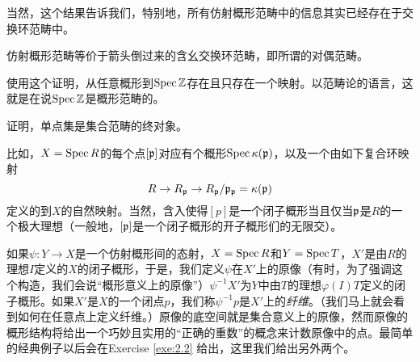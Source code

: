 当然，这个结果告诉我们，特别地，所有仿射概形范畴中的信息其实已经存在于交换环范畴中。

\begin{coro}\label{coro:1.41}
	仿射概形范畴等价于箭头倒过来的含幺交换环范畴，即所谓的对偶范畴。
\end{coro}

\begin{exe}\label{exe:1.42}
	\begin{compactenum}[(a)]
	\item 使用这个证明，从任意概形到$\operatorname{Spec} \mathbb{Z}$存在且只存在一个映射。以范畴论的语言，这就是在说$\operatorname{Spec} \mathbb{Z}$是概形范畴的。
	\item 证明，单点集是集合范畴的终对象。
	\end{compactenum}
\end{exe}

比如，$X=\operatorname{Spec} R$的每个点$[\mathfrak{p}]$对应有个概形$\operatorname{Spec} \kappa(\mathfrak{p})$，以及一个由如下复合环映射
\[
	R\to R_{\mathfrak{p}}\to R_{\mathfrak{p}}/\mathfrak{p}_{\mathfrak{p}}=\kappa(\mathfrak{p})
\]
定义的到$X$的自然映射。当然，含入使得$[p]$是一个闭子概形当且仅当$\mathfrak{p}$是$R$的一个极大理想（一般地，$[\mathfrak{p}]$是一个闭子概形的开子概形们的无限交）。

如果$\psi:Y\to X$是一个仿射概形间的态射，$X=\operatorname{Spec} R$和$Y=\operatorname{Spec} T$，$X'$是由$R$的理想$I$定义的$X$的闭子概形，于是，我们定义$\psi$在$X'$上的原像（有时，为了强调这个构造，我们会说“概形意义上的原像”）$\psi^{-1}X'$为$Y$中由$T$的理想$\varphi(I)T$定义的闭子概形。如果$X'$是$X$的一个闭点$p$，我们称$\psi^{-1}p$是$X'$上的\textit{纤维}。（我们马上就会看到如何在任意点上定义纤维。）原像的底空间就是集合意义上的原像，然而原像的概形结构将给出一个巧妙且实用的“正确的重数”的概念来计数原像中的点。最简单的经典例子以后会在Exercise \ref{exe:2.2} 给出，这里我们给出另外两个。

